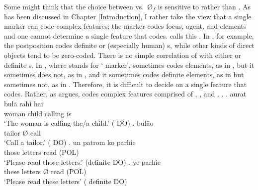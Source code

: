 Some might think that the choice between  vs.\ {\O$_{f}$} is sensitive to  rather than .
As has been discussed in Chapter \ref{Introduction}, I rather take the view that a single marker can code complex features;
the marker  codes focus, agent, and  elements
and one cannot determine a single feature that  codes.
 calls this .
In ,
for example,
the postposition  codes definite or  (especially human) s,
while other kinds of direct objects tend to be zero-coded.
There is no simple correlation of  with either  or definite s.
In \Next,
where  stands for ` marker',
 sometimes codes  elements, as in \Next[a], but it sometimes does not, as in \Next[c],
and it sometimes codes definite elements, as in \Next[c] but sometimes not, as in \Next[a,d].
Therefore,
it is difficult to decide on a single feature that  codes.
Rather,
as  argues,
 codes complex features comprised of , , and .
\ex.
 \ag. aurat   bul\={a} rahi hai \\
	woman child  calling  is \\
	`The woman is calling the/a child.' \hfill{( DO)}
 \bg.  \EM{\O} bul\={a}o \\
	tailor {\O} call \\
	`Call a tailor.' \hfill{(  DO)}
 \bg. un patrom ko parhie \\
	those letters  read (POL) \\
	`Please read those letters.' \hfill{(definite DO)}
 \bg. ye  \EM{\O} parhie \\
	these letters {\O} read (POL) \\
	`Please read these letters' \hfill{( definite DO)}
\begin{flushright}
\cite[][p.\ 48]{mcgregor72}
\end{flushright}

